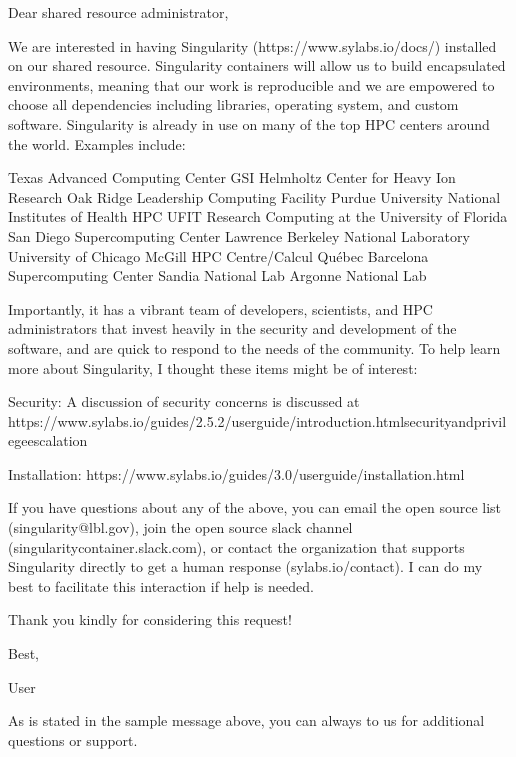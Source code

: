 \documentclass[letterpaper,10pt,english]{sphinxmanual}
\begin{document}
%
\begin{sphinxVerbatim}[commandchars=\\\{\}]
Dear shared resource administrator,

We are interested in having Singularity (https://www.sylabs.io/docs/)
installed on our shared resource. Singularity containers will allow us to
build encapsulated environments, meaning that our work is reproducible and
we are empowered to choose all dependencies including libraries, operating
system, and custom software. Singularity is already in use on many of the
top HPC centers around the world. Examples include:

    Texas Advanced Computing Center
    GSI Helmholtz Center for Heavy Ion Research
    Oak Ridge Leadership Computing Facility
    Purdue University
    National Institutes of Health HPC
    UFIT Research Computing at the University of Florida
    San Diego Supercomputing Center
    Lawrence Berkeley National Laboratory
    University of Chicago
    McGill HPC Centre/Calcul Québec
    Barcelona Supercomputing Center
    Sandia National Lab
    Argonne National Lab

Importantly, it has a vibrant team of developers, scientists, and HPC
administrators that invest heavily in the security and development of the
software, and are quick to respond to the needs of the community. To help
learn more about Singularity, I thought these items might be of interest:

    \PYGZhy{} Security: A discussion of security concerns is discussed at
    https://www.sylabs.io/guides/2.5.2/user\PYGZhy{}guide/introduction.html\PYGZsh{}security\PYGZhy{}and\PYGZhy{}privilege\PYGZhy{}escalation

    \PYGZhy{} Installation:
    https://www.sylabs.io/guides/3.0/user\PYGZhy{}guide/installation.html

If you have questions about any of the above, you can email the open source
list (singularity@lbl.gov), join the open source slack channel
(singularity\PYGZhy{}container.slack.com), or contact the organization that supports
Singularity directly to get a human response (sylabs.io/contact). I can do
my best to facilitate this interaction if help is needed.

Thank you kindly for considering this request!

Best,

User
\end{sphinxVerbatim}

As is stated in the sample message above, you can always  to us for additional questions or support.
\end{document}
